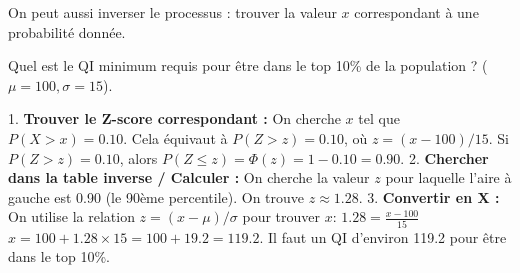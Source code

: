 On peut aussi inverser le processus : trouver la valeur $x$ correspondant à une probabilité donnée.

\begin{examplebox}
Quel est le QI minimum requis pour être dans le top 10\% de la population ? ($\mu=100, \sigma=15$).

1.  \textbf{Trouver le Z-score correspondant :} On cherche $x$ tel que $P(X > x) = 0.10$. Cela équivaut à $P(Z > z) = 0.10$, où $z = (x-100)/15$.
    Si $P(Z > z) = 0.10$, alors $P(Z \le z) = \Phi(z) = 1 - 0.10 = 0.90$.
2.  \textbf{Chercher dans la table inverse / Calculer :} On cherche la valeur $z$ pour laquelle l'aire à gauche est 0.90 (le 90ème percentile). On trouve $z \approx 1.28$.
3.  \textbf{Convertir en X :} On utilise la relation $z = (x-\mu)/\sigma$ pour trouver $x$:
    $1.28 = \frac{x - 100}{15}$
    $x = 100 + 1.28 \times 15 = 100 + 19.2 = 119.2$.
    Il faut un QI d'environ 119.2 pour être dans le top 10\%.
\end{examplebox}